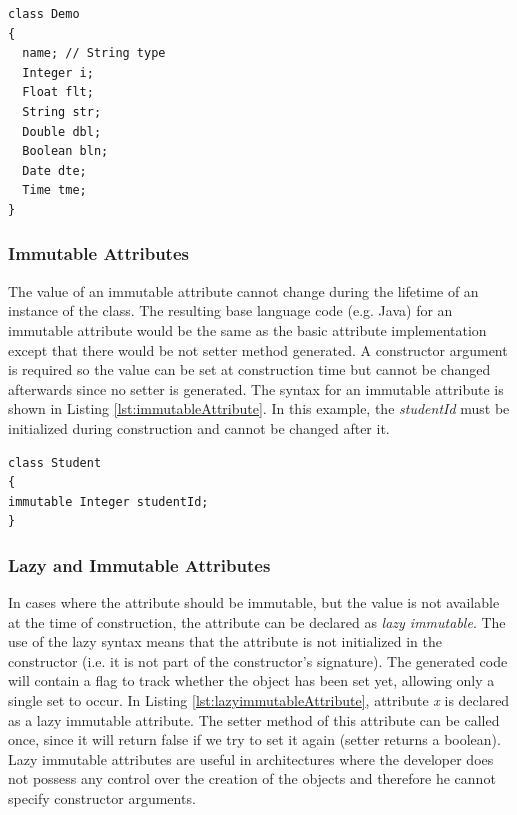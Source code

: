 \begin{lstlisting}[style=umplePlain, label=lst:basicAttribute,caption=Basic Umple attribute]
class Demo 
{
  name; // String type
  Integer i;
  Float flt;
  String str;  
  Double dbl;
  Boolean bln;
  Date dte; 
  Time tme;
}
\end{lstlisting}

\subsubsection{Immutable Attributes}
The value of an immutable attribute cannot change during the lifetime of an instance of the class. The resulting base language code (e.g. Java) for an immutable attribute would be the same as the basic attribute implementation except that there would be not setter method generated. A constructor argument is required so the value can be set at construction time but  cannot be changed afterwards since no setter is generated. The syntax for an immutable attribute is shown in Listing \ref{lst:immutableAttribute}. In this example, the \textit{studentId} must be initialized during construction and cannot be changed after it. 
\newpage
\begin{lstlisting}[style=umplePlain,label=lst:immutableAttribute, caption=Immutable Umple attribute]
class Student 
{
immutable Integer studentId;
}
\end{lstlisting}

\subsubsection{Lazy and Immutable Attributes}
In cases where the attribute should be immutable, but the value is not available at the time of construction, the attribute can be declared as \textit{lazy immutable}. The use of the lazy syntax means that the attribute is not initialized in the constructor (i.e. it is not part of the constructor's signature). The generated code will contain a flag to track whether the object has been set yet, allowing only a single set to occur. In Listing \ref{lst:lazyimmutableAttribute},
attribute \textit{x} is declared as a lazy immutable attribute. The setter method of this attribute can be called once, since it will return false if we try to set it again (setter returns a boolean). Lazy immutable attributes are useful in architectures where the developer does not possess any control over the creation of the objects and therefore he cannot specify constructor arguments.

